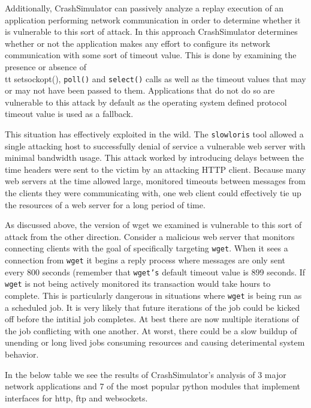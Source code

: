 Additionally, CrashSimulator can passively analyze a replay execution of an application performing network communication
in order to determine whether it is vulnerable to this sort of attack.  In this approach CrashSimulator determines
whether or not the application makes any effort to configure its network communication with some sort of timeout
value. This is done by examining the presence or absence of {\\tt setsockopt()}, {\tt poll()} and {\tt select()} calls
as well as the timeout values that may or may not have been passed to them. Applications that do not do so are
vulnerable to this attack by default as the operating system defined protocol timeout
value is used as a fallback.

This situation has effectively exploited in the wild.  The {\tt slowloris} tool allowed a single attacking
host to successfully denial of service a vulnerable web server with minimal bandwidth usage.  This attack
worked by introducing delays between the time headers were sent to the victim by an attacking HTTP client.
Because many web servers at the time allowed large, monitored timeouts between messages from the clients
they were communicating with, one web client could effectively tie up the resources of a web server for a
long period of time.

As discussed above, the version of wget we examined is vulnerable to this sort of attack from the other
direction.  Consider a malicious web server that monitors connecting clients with the goal of specifically
targeting {\tt wget}.  When it sees a connection from {\tt wget} it begins a reply process where messages
are only sent every 800 seconds (remember that {\tt wget's} default timeout value is 899 seconds.  If {\tt
  wget} is not being actively monitored its transaction would take hours to complete.  This is particularly
dangerous in situations where {\tt wget} is being run as a scheduled job.  It is very likely that future
iterations of the job could be kicked off before the intitial job completes.  At best there are now multiple
iterations of the job conflicting with one another.  At worst, there could be a slow buildup of unending or
long lived jobs consuming resources and causing deterimental system behavior.

In the below table we see the results of CrashSimulator's analysis of 3 major network applications and 7
of the most popular python modules that implement interfaces for http, ftp and websockets.

